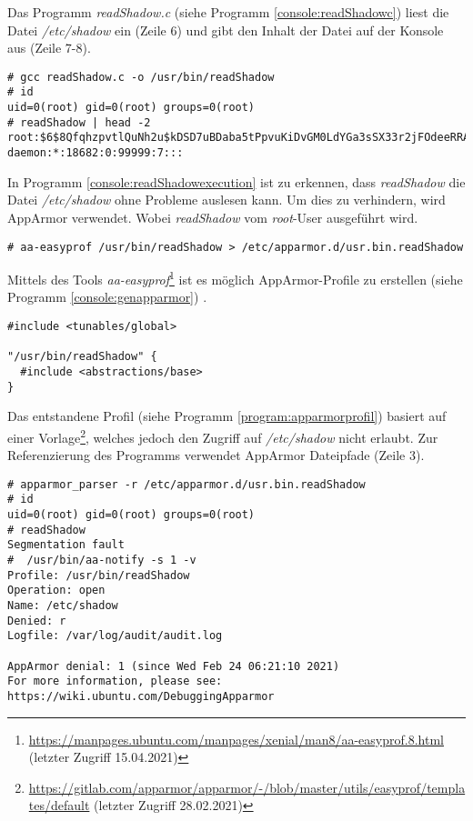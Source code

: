 Das Programm \emph{readShadow.c} (siehe Programm \ref{console:readShadowc})
liest die Datei \emph{/etc/shadow} ein (Zeile 6) und gibt den Inhalt der Datei
auf der Konsole aus (Zeile 7-8).

\begin{lstlisting}[label={console:readShadowexecution},caption={Kompilieren und
Ausführen von \emph{readShadow}}]
# gcc readShadow.c -o /usr/bin/readShadow
# id
uid=0(root) gid=0(root) groups=0(root)
# readShadow | head -2
root:$6$8QfqhzpvtlQuNh2u$kDSD7uBDaba5tPpvuKiDvGM0LdYGa3sSX33r2jFOdeeRRAfm1C8y.aS8eo.ogN.NeH8kOGxbM5vBfCQi0myr8.:18683:0:99999:7:::
daemon:*:18682:0:99999:7:::
\end{lstlisting}

In Programm \ref{console:readShadowexecution} ist zu erkennen, dass
\emph{readShadow} die Datei \emph{/etc/shadow} ohne Probleme auslesen kann. Um
dies zu verhindern, wird AppArmor verwendet. Wobei \emph{readShadow} vom
\emph{root}-User ausgeführt wird. 

\begin{lstlisting}[label={console:genapparmor}, caption={Generierung des AppArmor-Profils}]
# aa-easyprof /usr/bin/readShadow > /etc/apparmor.d/usr.bin.readShadow
\end{lstlisting}

Mittels des Tools
\emph{aa-easyprof}\footnote{\url{https://manpages.ubuntu.com/manpages/xenial/man8/aa-easyprof.8.html}
(letzter Zugriff 15.04.2021)} ist es möglich AppArmor-Profile zu erstellen 
(siehe Programm \ref{console:genapparmor})
\cite{man_aaeasyprof}. 

\clearpage
\begin{lstlisting}[label={program:apparmorprofil}, caption={AppArmor-Profil\protect\footnotemark}]
#include <tunables/global>

"/usr/bin/readShadow" {
  #include <abstractions/base>
}
\end{lstlisting}

Das entstandene Profil (siehe Programm \ref{program:apparmorprofil}) basiert auf einer
Vorlage\footnote{\url{https://gitlab.com/apparmor/apparmor/-/blob/master/utils/easyprof/templates/default}
(letzter Zugriff 28.02.2021)}, welches jedoch den Zugriff auf
\emph{/etc/shadow} nicht erlaubt. Zur Referenzierung des Programms verwendet
AppArmor Dateipfade (Zeile 3). 

\begin{lstlisting}[label={console:activateapparmor},caption={Aktivierung des AppArmor-Profils}]
# apparmor_parser -r /etc/apparmor.d/usr.bin.readShadow
# id
uid=0(root) gid=0(root) groups=0(root)
# readShadow
Segmentation fault
#  /usr/bin/aa-notify -s 1 -v
Profile: /usr/bin/readShadow
Operation: open
Name: /etc/shadow
Denied: r
Logfile: /var/log/audit/audit.log

AppArmor denial: 1 (since Wed Feb 24 06:21:10 2021)
For more information, please see: https://wiki.ubuntu.com/DebuggingApparmor
\end{lstlisting}

